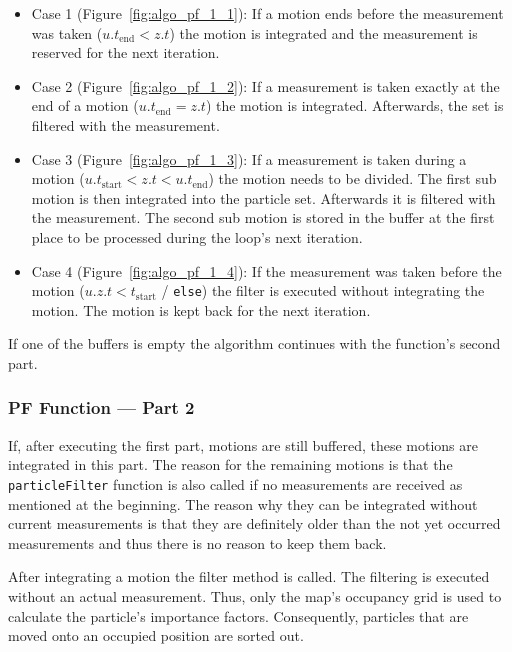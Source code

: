 \begin{itemize}
\item{Case 1} (Figure~\ref{fig:algo_pf_1_1}): If a motion ends before the measurement was taken ($u.{t_\text{end}} < z.t$) the motion is integrated and the measurement is reserved for the next iteration.

\item{Case 2} (Figure~\ref{fig:algo_pf_1_2}): If a measurement is taken exactly at the end of a motion ($u.{t_\text{end}} = z.t$) the motion is integrated. Afterwards, the set is filtered with the measurement.

\item{Case 3} (Figure~\ref{fig:algo_pf_1_3}): If a measurement is taken during a motion ($u.{t_\text{start}} < z.t < u.{t_\text{end}}$) the motion needs to be divided. The first sub motion is then integrated into the particle set. Afterwards it is filtered with the measurement. The second sub motion is stored in the buffer at the first place to be processed during the loop's next iteration.

\item{Case 4} (Figure~\ref{fig:algo_pf_1_4}): If the measurement was taken before the motion ($u.{z.t < t_\text{start}}$ / \texttt{else}) the filter is executed without integrating the motion. The motion is kept back for the next iteration.
\end{itemize}

\noindent If one of the buffers is empty the algorithm continues with the function's second part.


\subsubsection*{\acl{PF} Function --- Part 2}
If, after executing the first part, motions are still buffered, these motions are integrated in this part. The reason for the remaining motions is that the \texttt{particleFilter} function is also called if no measurements are received as mentioned at the beginning. The reason why they can be integrated without current measurements is that they are definitely older than the not yet occurred measurements and thus there is no reason to keep them back.

After integrating a motion the filter method is called. The filtering is executed without an actual measurement. Thus, only the map's occupancy grid is used to calculate the particle's importance factors. Consequently, particles that are moved onto an occupied position are sorted out.

